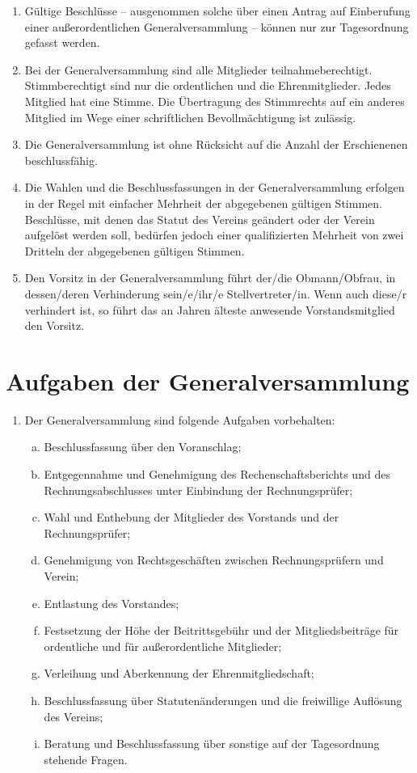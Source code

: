 \documentclass[a4paper,12pt]{article}
\begin{document}
\begin{enumerate}
\item Gültige Beschlüsse – ausgenommen solche über einen Antrag auf Einberufung einer außerordentlichen Generalversammlung – können nur zur Tagesordnung gefasst werden.

\item\label{item:stimmberechtigt} Bei der Generalversammlung sind alle Mitglieder teilnahmeberechtigt. Stimmberechtigt sind nur die ordentlichen und die Ehrenmitglieder. Jedes Mitglied hat eine Stimme. Die Übertragung des Stimmrechts auf ein anderes Mitglied im Wege einer schriftlichen Bevollmächtigung ist zulässig.

\item Die Generalversammlung ist ohne Rücksicht auf die Anzahl der Erschienenen beschlussfähig.

\item Die Wahlen und die Beschlussfassungen in der Generalversammlung erfolgen in der Regel mit einfacher Mehrheit der abgegebenen gültigen Stimmen. Beschlüsse, mit denen das Statut des Vereins geändert oder der Verein aufgelöst werden soll, bedürfen jedoch einer qualifizierten Mehrheit von zwei Dritteln der abgegebenen gültigen Stimmen.

\item  Den Vorsitz in der Generalversammlung führt der/die Obmann/Obfrau, in dessen/deren Verhinderung sein/e/ihr/e Stellvertreter/in. Wenn auch diese/r verhindert ist, so führt das an Jahren älteste anwesende Vorstandsmitglied den Vorsitz.
\end{enumerate}

\section{Aufgaben der Generalversammlung} %
\label{sec:Generalversammlung-Aufgaben}
\begin{enumerate}
\item Der Generalversammlung sind folgende Aufgaben vorbehalten:
  \begin{enumerate}[(a)]
  \item Beschlussfassung über den Voranschlag; 
  \item Entgegennahme und Genehmigung des Rechenschaftsberichts und des Rechnungsabschlusses unter Einbindung der Rechnungsprüfer;
  \item Wahl und Enthebung der Mitglieder des Vorstands und der Rechnungsprüfer;
  \item Genehmigung von Rechtsgeschäften zwischen Rechnungsprüfern und Verein;
  \item Entlastung des Vorstandes;
  \item Festsetzung der Höhe der Beitrittsgebühr und der Mitgliedsbeiträge für ordentliche und für außerordentliche Mitglieder;
  \item Verleihung und Aberkennung der Ehrenmitgliedschaft;
  \item Beschlussfassung über Statutenänderungen und die freiwillige Auflösung des Vereins;
  \item Beratung und Beschlussfassung über sonstige auf der Tagesordnung stehende Fragen.
  \end{enumerate}
\end{enumerate}
\end{document}
